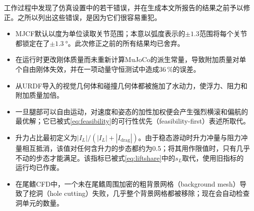 工作过程中发现了仿真设置中的若干错误，并在生成本文所报告的结果之前予以修正。之所以列出这些错误，是因为它们很容易重犯。
\begin{itemize}
  \item MJCF默认以度为单位读取关节范围；本意以弧度表示的$\pm1.3$范围将每个关节都锁定在了$\pm\SI{1.3}{\degree}$。此次修正之前的所有结果均已舍弃。
  \item 在运行时更改刚体质量而未重新计算MuJoCo的派生常量，导致附加质量对单个自由刚体失效，并在一项动量守恒测试中造成36\,\%的误差。
  \item 从URDF导入的视觉几何体和碰撞几何体都被施加了水动力，使浮力、阻力和附加质量加倍。
  \item 一旦腿部可以自由运动，对速度和姿态的加性加权便会产生强烈横滚和偏航的最优解；它已被式\eqref{eq:feasibility}的可行性优先（feasibility-first）表述所取代。
  \item 升力占比最初定义为$|I_L|/(|I_L|+|I_\text{drag}|)$。由于稳态游动时升力冲量与阻力冲量相互抵消，该值对任何含升力的步态都约为0.5；将其用作限值时，只有几乎不动的步态才能满足。该指标已被式\eqref{eq:liftshare}中的$s_L$取代，使用旧指标的运行均已作废。
  \item 在尾鳍CFD中，一个未在尾鳍周围加密的粗背景网格（background mesh）导致了挖洞（hole cutting）失败，几乎整个背景网格都被移除；现在会自动检查洞单元的数量。
\end{itemize}
